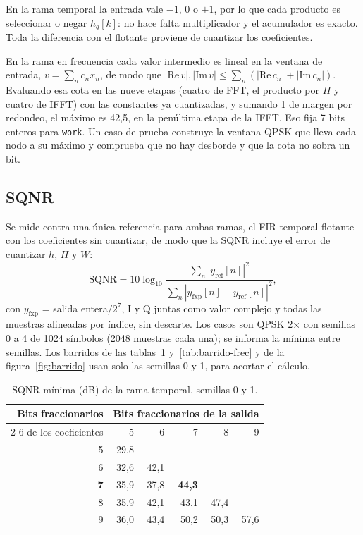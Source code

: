 En la rama temporal la entrada vale $-1$, 0 o $+1$, por lo que cada producto es seleccionar o negar $h_q[k]$: no hace falta multiplicador y el acumulador es exacto. Toda la diferencia con el flotante proviene de cuantizar los coeficientes.

En la rama en frecuencia cada valor intermedio es lineal en la ventana de entrada, $v = \sum_n c_n x_n$, de modo que $|\mathrm{Re}\,v|, |\mathrm{Im}\,v| \le \sum_n (|\mathrm{Re}\,c_n| + |\mathrm{Im}\,c_n|)$. Evaluando esa cota en las nueve etapas (cuatro de FFT, el producto por $H$ y cuatro de IFFT) con las constantes ya cuantizadas, y sumando 1 de margen por redondeo, el máximo es 42,5, en la penúltima etapa de la IFFT. Eso fija 7 bits enteros para \texttt{work}. Un caso de prueba construye la ventana QPSK que lleva cada nodo a su máximo y comprueba que no hay desborde y que la cota no sobra un bit.

\subsection{SQNR}

Se mide contra una única referencia para ambas ramas, el FIR temporal flotante con los coeficientes sin cuantizar, de modo que la SQNR incluye el error de cuantizar $h$, $H$ y $W$:
\begin{equation}
  \mathrm{SQNR} = 10 \log_{10} \frac{\sum_n |y_\mathrm{ref}[n]|^2}{\sum_n |y_\mathrm{fxp}[n] - y_\mathrm{ref}[n]|^2},
\end{equation}
con $y_\mathrm{fxp}$ = salida entera$/2^7$, I y Q juntas como valor complejo y todas las muestras alineadas por índice, sin descarte. Los casos son QPSK 2× con semillas 0 a 4 de 1024 símbolos (2048 muestras cada una); se informa la mínima entre semillas. Los barridos de las tablas~\ref{tab:barrido} y~\ref{tab:barrido-frec} y de la figura~\ref{fig:barrido} usan solo las semillas 0 y 1, para acortar el cálculo.

\begin{table}[h]
  \centering
  \caption{SQNR mínima (dB) de la rama temporal, semillas 0 y 1.}\label{tab:barrido}
  \begin{tabular}{rrrrrr}
    \toprule
    Bits fraccionarios & \multicolumn{5}{c}{Bits fraccionarios de la salida} \\
    \cmidrule(lr){2-6}
    de los coeficientes & 5 & 6 & 7 & 8 & 9 \\
    \midrule
    5 & 29,8 & & & & \\
    6 & 32,6 & 42,1 & & & \\
    \textbf{7} & 35,9 & 37,8 & \textbf{44,3} & & \\
    8 & 35,9 & 42,1 & 43,1 & 47,4 & \\
    9 & 36,0 & 43,4 & 50,2 & 50,3 & 57,6 \\
    \bottomrule
  \end{tabular}
\end{table}

